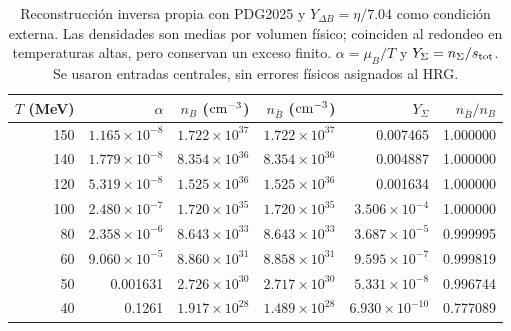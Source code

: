 \begin{table}[t]\centering\small
\caption{Reconstrucción inversa propia con PDG2025 y $Y_{\Delta B}=\eta/7.04$ como condición externa. Las densidades son medias por volumen físico; coinciden al redondeo en temperaturas altas, pero conservan un exceso finito. $\alpha=\mu_B/T$ y $Y_\Sigma=n_\Sigma/s_{\rm tot}$. Se usaron entradas centrales, sin errores físicos asignados al HRG.}\label{tab:inversepop}
\setlength{\tabcolsep}{7pt}\renewcommand{\arraystretch}{1.14}
\begin{tabular}{rrrrrr}\toprule
$T$ (MeV) & $\alpha$ & $n_B$ (${\rm cm^{-3}}$) & $n_{\bar B}$ (${\rm cm^{-3}}$) & $Y_\Sigma$ & $n_{\bar B}/n_B$ \\ \midrule
150 & $1.165\times10^{-8}$ & $1.722\times10^{37}$ & $1.722\times10^{37}$ & 0.007465 & 1.000000 \\
140 & $1.779\times10^{-8}$ & $8.354\times10^{36}$ & $8.354\times10^{36}$ & 0.004887 & 1.000000 \\
120 & $5.319\times10^{-8}$ & $1.525\times10^{36}$ & $1.525\times10^{36}$ & 0.001634 & 1.000000 \\
100 & $2.480\times10^{-7}$ & $1.720\times10^{35}$ & $1.720\times10^{35}$ & $3.506\times10^{-4}$ & 1.000000 \\
80 & $2.358\times10^{-6}$ & $8.643\times10^{33}$ & $8.643\times10^{33}$ & $3.687\times10^{-5}$ & 0.999995 \\
60 & $9.060\times10^{-5}$ & $8.860\times10^{31}$ & $8.858\times10^{31}$ & $9.595\times10^{-7}$ & 0.999819 \\
50 & 0.001631 & $2.726\times10^{30}$ & $2.717\times10^{30}$ & $5.331\times10^{-8}$ & 0.996744 \\
40 & 0.1261 & $1.917\times10^{28}$ & $1.489\times10^{28}$ & $6.930\times10^{-10}$ & 0.777089 \\
\bottomrule\end{tabular}\end{table}
